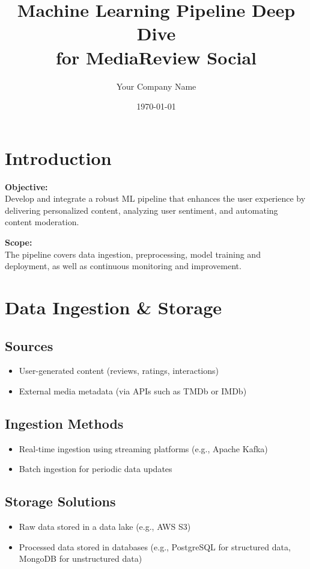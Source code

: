 \documentclass[11pt]{article}
\title{Machine Learning Pipeline Deep Dive\\ for MediaReview Social}
\author{Your Company Name}
\date{\today}
\begin{document}
\maketitle
\tableofcontents
\newpage

\section{Introduction}
\textbf{Objective:} \\
Develop and integrate a robust ML pipeline that enhances the user experience by delivering personalized content, analyzing user sentiment, and automating content moderation.

\textbf{Scope:} \\
The pipeline covers data ingestion, preprocessing, model training and deployment, as well as continuous monitoring and improvement.

\section{Data Ingestion \& Storage}
\subsection*{Sources}
\begin{itemize}[noitemsep]
    \item User-generated content (reviews, ratings, interactions)
    \item External media metadata (via APIs such as TMDb or IMDb)
\end{itemize}

\subsection*{Ingestion Methods}
\begin{itemize}[noitemsep]
    \item Real-time ingestion using streaming platforms (e.g., Apache Kafka)
    \item Batch ingestion for periodic data updates
\end{itemize}

\subsection*{Storage Solutions}
\begin{itemize}[noitemsep]
    \item Raw data stored in a data lake (e.g., AWS S3)
    \item Processed data stored in databases (e.g., PostgreSQL for structured data, MongoDB for unstructured data)
\end{itemize}
\end{document}

